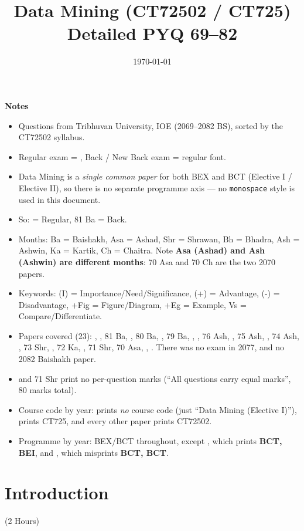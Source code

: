 \documentclass[12pt]{article}
\title{Data Mining (CT72502 / CT725)\\[0.4em]\large Detailed PYQ 69--82}
\author{}
\date{\today}
\begin{document}
\maketitle
\vspace{6cm}
\textbf{Notes}
\begin{itemize}[noitemsep]
  \item Questions from Tribhuvan University, IOE (2069--2082 BS), sorted by the CT72502 syllabus.
  \item Regular exam = , Back / New Back exam = regular font.
  \item Data Mining is a \emph{single common paper} for both BEX and BCT (Elective I / Elective II), so there is no separate programme axis --- no \texttt{monospace} style is used in this document.
  \item So:  = Regular, 81 Ba = Back.
  \item Months: Ba = Baishakh, Asa = Ashad, Shr = Shrawan, Bh = Bhadra, Ash = Ashwin, Ka = Kartik, Ch = Chaitra. Note \textbf{Asa (Ashad) and Ash (Ashwin) are different months}: 70 Asa and 70 Ch are the two 2070 papers.
  \item Keywords: (I) = Importance/Need/Significance, (+) = Advantage, (-) = Disadvantage, +Fig = Figure/Diagram, +Eg = Example, Vs = Compare/Differentiate.
  \item Papers covered (23): , , 81 Ba, , 80 Ba, , 79 Ba, , , 76 Ash, , 75 Ash, , 74 Ash, , 73 Shr, , 72 Ka, , 71 Shr, 70 Asa, , . There was no exam in 2077, and no 2082 Baishakh paper.
  \item {} and 71 Shr print no per-question marks (``All questions carry equal marks'', 80 marks total).
  \item Course code by year:  prints \emph{no} course code (just ``Data Mining (Elective I)''),  prints CT725, and every other paper prints CT72502.
  \item Programme by year: BEX/BCT throughout, except , which prints \textbf{BCT, BEI}, and , which misprints \textbf{BCT, BCT}.
\end{itemize}
\pagebreak
\tableofcontents
\pagebreak

\section{Introduction}
\begin{center}(2 Hours)\end{center}
\end{document}
